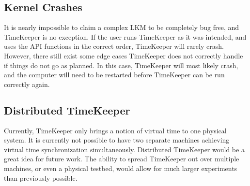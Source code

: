 \subsection{Kernel Crashes}
It is nearly impossible to claim a complex LKM to be completely bug free, and TimeKeeper is no exception. If the user runs TimeKeeper as it was intended, and uses the API functions in the correct order, TimeKeeper will rarely crash. However, there still exist some edge cases TimeKeeper does not correctly handle if things do not go as planned. In this case, TimeKeeper will most likely crash, and the computer will need to be restarted before TimeKeeper can be run correctly again. 
\subsection{Distributed TimeKeeper}
Currently, TimeKeeper only brings a notion of virtual time to one physical system. It is currently not possible to have two separate machines achieving virtual time synchronization simultaneously. Distributed TimeKeeper would be a great idea for future work. The ability to spread TimeKeeper out over multiple machines, or even a physical testbed, would allow for much larger experiments than previously possible.

